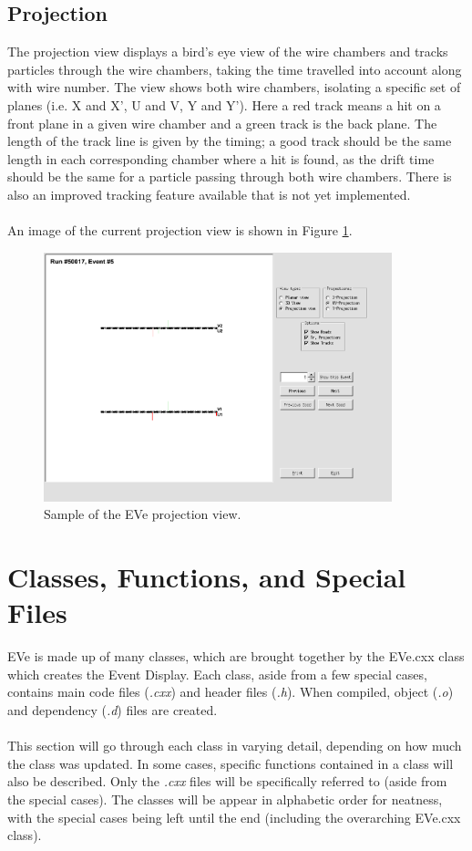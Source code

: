 \documentclass[12pt]{article}
\numberwithin{equation}{section}
\begin{document}
\subsection{Projection} 
The projection view displays a bird's eye view of the wire chambers and tracks particles through the wire chambers, taking the time travelled into account along with wire number. The view shows both wire chambers, isolating a specific set of planes (i.e. X and X', U and V, Y and Y'). Here a red track means a hit on a front plane in a given wire chamber and a green track is the back plane. The length of the track line is given by the timing; a good track should be the same length in each corresponding chamber where a hit is found, as the drift time should be the same for a particle passing through both wire chambers. There is also an improved tracking feature available that is not yet implemented.
\\
\\
An image of the current projection view is shown in Figure \ref{fig:proj}.
\begin{figure}[h!]
	\caption{Sample of the EVe projection view.} \label{fig:proj}
	\centering
	\includegraphics[width=0.9\textwidth]{ProjView.png} 
\end{figure} 

\section{Classes, Functions, and Special Files}
EVe is made up of many classes, which are brought together by the EVe.cxx class which creates the Event Display. Each class, aside from a few special cases, contains main code files (\textit{.cxx}) and header files (\textit{.h}). When compiled, object (\textit{.o}) and dependency (\textit{.d}) files are created.
\\
\\
This section will go through each class in varying detail, depending on how much the class was updated. In some cases, specific functions contained in a class will also be described. Only the \textit{.cxx} files will be specifically referred to (aside from the special cases). The classes will be appear in alphabetic order for neatness, with the special cases being left until the end (including the overarching EVe.cxx class).
\end{document}
